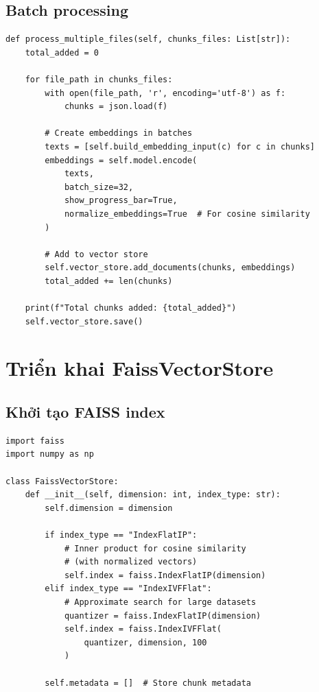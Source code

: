 \documentclass[../DoAn.tex]{subfiles}
\begin{document}
\subsection{Batch processing}
\begin{verbatim}
def process_multiple_files(self, chunks_files: List[str]):
    total_added = 0
    
    for file_path in chunks_files:
        with open(file_path, 'r', encoding='utf-8') as f:
            chunks = json.load(f)
        
        # Create embeddings in batches
        texts = [self.build_embedding_input(c) for c in chunks]
        embeddings = self.model.encode(
            texts, 
            batch_size=32,
            show_progress_bar=True,
            normalize_embeddings=True  # For cosine similarity
        )
        
        # Add to vector store
        self.vector_store.add_documents(chunks, embeddings)
        total_added += len(chunks)
    
    print(f"Total chunks added: {total_added}")
    self.vector_store.save()
\end{verbatim}

\section{Triển khai FaissVectorStore}

\subsection{Khởi tạo FAISS index}
\begin{verbatim}
import faiss
import numpy as np

class FaissVectorStore:
    def __init__(self, dimension: int, index_type: str):
        self.dimension = dimension
        
        if index_type == "IndexFlatIP":
            # Inner product for cosine similarity
            # (with normalized vectors)
            self.index = faiss.IndexFlatIP(dimension)
        elif index_type == "IndexIVFFlat":
            # Approximate search for large datasets
            quantizer = faiss.IndexFlatIP(dimension)
            self.index = faiss.IndexIVFFlat(
                quantizer, dimension, 100
            )
        
        self.metadata = []  # Store chunk metadata
\end{verbatim}
\end{document}
